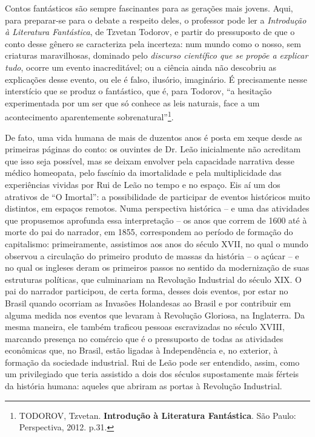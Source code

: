 \documentclass{extarticle}
\begin{document}
Contos fantásticos são sempre fascinantes para as gerações mais jovens.
Aqui, para preparar-se para o debate a respeito deles, o professor pode
ler a \emph{Introdução à Literatura Fantástica}, de Tzvetan Todorov, e
partir do pressuposto de que o conto desse gênero se caracteriza pela
incerteza: num mundo como o nosso, sem criaturas maravilhosas, dominado
pelo \emph{discurso científico que se propõe a explicar tudo}, ocorre um
evento inacreditável; ou a ciência ainda não descobriu as explicações
desse evento, ou ele é falso, ilusório, imaginário. É precisamente nesse
interstício que se produz o fantástico, que é, para Todorov, ``a
hesitação experimentada por um ser que só conhece as leis naturais, face
a um acontecimento aparentemente sobrenatural''\footnote{TODOROV,
  Tzvetan. \textbf{Introdução à Literatura Fantástica}. São Paulo:
  Perspectiva, 2012. p.31.}.

De fato, uma vida humana de mais de duzentos anos é posta em xeque desde
as primeiras páginas do conto: os ouvintes de Dr. Leão inicialmente não
acreditam que isso seja possível, mas se deixam envolver pela capacidade
narrativa desse médico homeopata, pelo fascínio da imortalidade e pela
multiplicidade das experiências vividas por Rui de Leão no tempo e no
espaço. Eis aí um dos atrativos de ``O Imortal'': a possibilidade de
participar de eventos históricos muito distintos, em espaços remotos.
Numa perspectiva histórica -- e uma das atividades que propusemos
aprofunda essa interpretação -- os anos que correm de 1600 até à morte
do pai do narrador, em 1855, correspondem ao período de formação do
capitalismo: primeiramente, assistimos aos anos do século XVII, no qual
o mundo observou a circulação do primeiro produto de massas da história
-- o açúcar -- e no qual os ingleses deram os primeiros passos no
sentido da modernização de suas estruturas políticas, que culminariam na
Revolução Industrial do século XIX. O pai do narrador participou, de
certa forma, desses dois eventos, por estar no Brasil quando ocorriam as
Invasões Holandesas ao Brasil e por contribuir em alguma medida nos
eventos que levaram à Revolução Gloriosa, na Inglaterra. Da mesma
maneira, ele também traficou pessoas escravizadas no século XVIII,
marcando presença no comércio que é o pressuposto de todas as atividades
econômicas que, no Brasil, estão ligadas à Independência e, no exterior,
à formação da sociedade industrial. Rui de Leão pode ser entendido,
assim, como um privilegiado que teria assistido a dois dos séculos
supostamente mais férteis da história humana: aqueles que abriram as
portas à Revolução Industrial.
\end{document}
